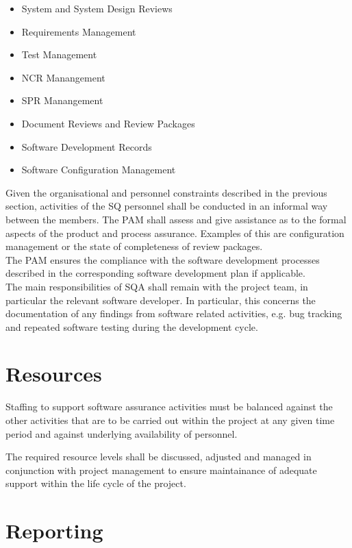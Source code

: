 \begin{itemize}
	\item System and System Design Reviews
	\item Requirements Management
	\item Test Management
	\item \gls{NCR} Manangement
	\item \gls{SPR} Manangement
	\item Document Reviews and Review Packages
	\item Software Development Records
	\item Software Configuration Management
\end{itemize}

\noindent
Given the organisational and personnel constraints described in the previous
section, activities of the \gls{SQ} personnel shall be conducted in an informal
way between the members. The \gls{PAM} shall assess and give assistance as to
the formal aspects of the product and process assurance. Examples of this
are configuration management or the state of completeness of review packages.\\

\noindent
The \gls{PAM} ensures the compliance with the software development processes
described in the corresponding software development plan if applicable.\\

\noindent
The main responsibilities of \gls{SQA} shall remain with the project team, in
particular the relevant software developer. In particular, this concerns
the documentation of any findings from software related activities, e.g. bug
tracking and repeated software testing during the development cycle.



\section{Resources}

Staffing to support software assurance activities must be balanced against the
other activities that are to be carried out within the project at any given time
period and against underlying availability of personnel.

The required resource levels shall be discussed, adjusted and managed in
conjunction with project management to ensure maintainance of adequate support
within the life cycle of the project.


\section{Reporting}

